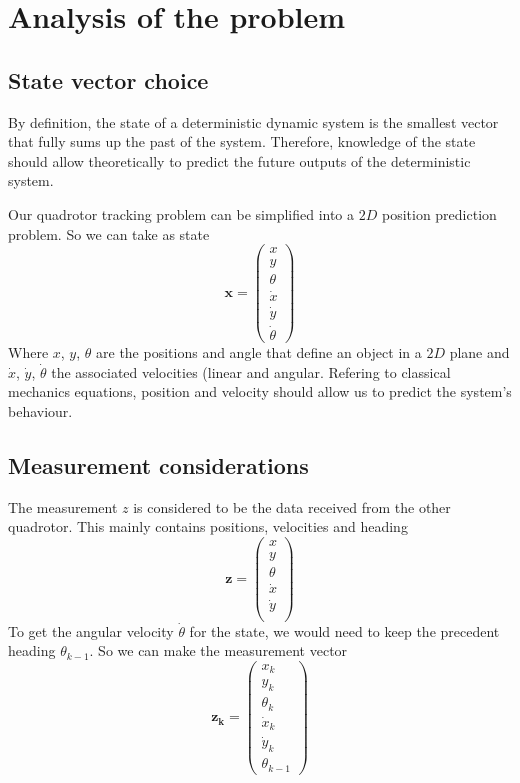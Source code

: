 \documentclass[12pt]{article}
\begin{document}
\section{Analysis of the problem}

\subsection{State vector choice}
By definition, the state of a deterministic dynamic system is the smallest vector that fully sums up the past of the system.
Therefore, knowledge of the state should allow theoretically to predict the future outputs of the deterministic system.

Our quadrotor tracking problem can be simplified into a $2D$ position prediction problem.
So we can take as state
\begin{equation}
\mathbf{x} =
    \begin{pmatrix}
        x\\
        y\\
        \theta\\
        \dot{x}\\
        \dot{y}\\
        \dot{\theta}
    \end{pmatrix}
\end{equation}
Where $x$, $y$, $\theta$ are the positions and angle that define an object in a $2D$ plane and $\dot{x}$, $\dot{y}$, $\dot{\theta}$ the associated velocities (linear and angular.
Refering to classical mechanics equations, position and velocity should allow us to predict the system's behaviour.

\subsection{Measurement considerations}
The measurement $z$ is considered to be the data received from the other quadrotor. This mainly contains positions, velocities and heading
\begin{equation}
\mathbf{z} =
    \begin{pmatrix}
        x\\
        y\\
        \theta\\
        \dot{x}\\
        \dot{y}\\
    \end{pmatrix}
\end{equation}
To get the angular velocity $\dot{\theta}$ for the state, we would need to keep the precedent heading $\theta_{k-1}$.
So we can make the measurement vector
\begin{equation}
\mathbf{z_k} =
    \begin{pmatrix}
        x_k\\
        y_k\\
        \theta_k\\
        \dot{x}_k\\
        \dot{y}_k\\
        \theta_{k-1}
    \end{pmatrix}
\end{equation}
\end{document}
